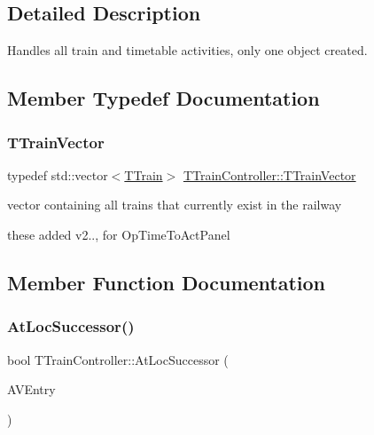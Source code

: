 \subsection{Detailed Description}
Handles all train and timetable activities, only one object created. 

\subsection{Member Typedef Documentation}
\mbox{\label{class_t_train_controller_aa9073b97736a2733dbdaf8dc52e34c24}} 
\subsubsection{\texorpdfstring{T\+Train\+Vector}{TTrainVector}}
{\footnotesize\ttfamily typedef std\+::vector$<$\mbox{\hyperlink{class_t_train}{T\+Train}}$>$ \mbox{\hyperlink{class_t_train_controller_aa9073b97736a2733dbdaf8dc52e34c24}{T\+Train\+Controller\+::\+T\+Train\+Vector}}}



vector containing all trains that currently exist in the railway 

these added v2.., for Op\+Time\+To\+Act\+Panel 

\subsection{Member Function Documentation}
\mbox{\label{class_t_train_controller_a7fbe0dc297130da79bcfa3503c6c51c1}} 
\subsubsection{\texorpdfstring{At\+Loc\+Successor()}{AtLocSuccessor()}}
{\footnotesize\ttfamily bool T\+Train\+Controller\+::\+At\+Loc\+Successor (\begin{DoxyParamCaption}\item[{const \mbox{\hyperlink{class_t_action_vector_entry}{T\+Action\+Vector\+Entry}} \&}]{A\+V\+Entry }\end{DoxyParamCaption})}

